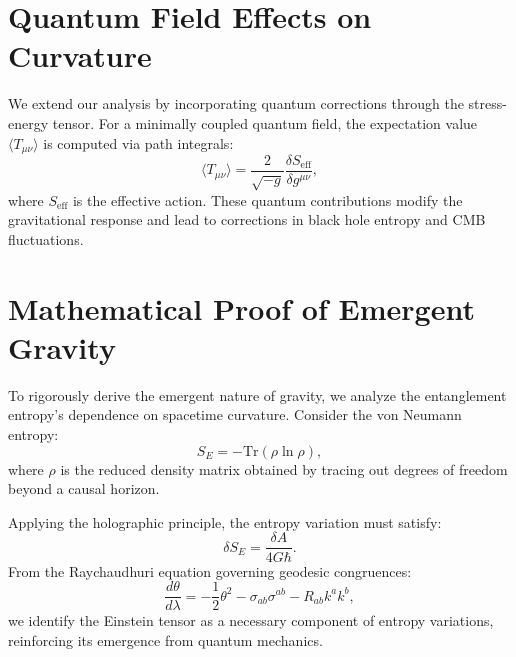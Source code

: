 \documentclass[12pt, a4paper]{article}
\begin{document}
\section{Quantum Field Effects on Curvature}
We extend our analysis by incorporating quantum corrections through the stress-energy tensor. For a minimally coupled quantum field, the expectation value $\langle T_{\mu\nu} \rangle$ is computed via path integrals:
\begin{equation}
    \langle T_{\mu\nu} \rangle = \frac{2}{\sqrt{-g}} \frac{\delta S_{\text{eff}}}{\delta g^{\mu\nu}},
\end{equation}
where $S_{\text{eff}}$ is the effective action. These quantum contributions modify the gravitational response and lead to corrections in black hole entropy and CMB fluctuations.

\section{Mathematical Proof of Emergent Gravity}
To rigorously derive the emergent nature of gravity, we analyze the entanglement entropy's dependence on spacetime curvature. Consider the von Neumann entropy:
\begin{equation}
    S_{E} = -\text{Tr} (\rho \ln \rho),
\end{equation}
where $\rho$ is the reduced density matrix obtained by tracing out degrees of freedom beyond a causal horizon.

Applying the holographic principle, the entropy variation must satisfy:
\begin{equation}
    \delta S_{E} = \frac{\delta A}{4 G \hbar}.
\end{equation}
From the Raychaudhuri equation governing geodesic congruences:
\begin{equation}
    \frac{d\theta}{d\lambda} = -\frac{1}{2} \theta^2 - \sigma_{ab} \sigma^{ab} - R_{ab} k^a k^b,
\end{equation}
we identify the Einstein tensor as a necessary component of entropy variations, reinforcing its emergence from quantum mechanics.
\end{document}
